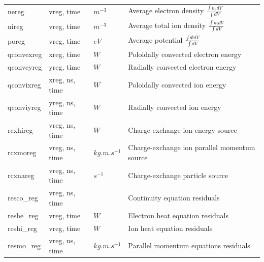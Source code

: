 \documentclass[a4paper,10pt]{report}
\begin{document}
\begin{center}
\begin{longtable}{|l|l|l|l|}
nereg \index{nereg}\index{b2tallies.nc, nereg}                                   & vreg, time     & $m^{-3}$      & Average electron density $\frac{\int n_e dV}{\int dV}$ \\
nireg \index{nireg}\index{b2tallies.nc, nireg}                                   & vreg, time     & $m^{-3}$      & Average total ion density $\frac{\int n_i dV}{\int dV}$  \\
poreg \index{poreg}\index{b2tallies.nc, poreg}                                   & vreg, time     & $eV$          & Average potential $\frac{\int \Phi dV}{\int dV}$ \\
qconvexreg \index{qconvexreg}\index{b2tallies.nc, qconvexreg}                    & xreg, time     & $W$           & Poloidally convected electron energy  \\
qconveyreg \index{qconveyreg}\index{b2tallies.nc, qconveyreg}                    & yreg, time     & $W$           & Radially convected electron energy \\
qconvixreg \index{qconvixreg}\index{b2tallies.nc, qconvixreg}                    & xreg, ns, time & $W$           & Poloidally convected ion energy \\
qconviyreg \index{qconviyreg}\index{b2tallies.nc, qconviyreg}                    & yreg, ns, time & $W$           & Radially convected ion energy \\
rcxhireg \index{rcxhireg}\index{b2tallies.nc, rcxhireg}                          & vreg, ns, time & $W$           & Charge-exchange ion energy source \\
rcxmoreg \index{rcxmoreg}\index{b2tallies.nc, rcxmoreg}                          & vreg, ns, time & $kg.m.s^{-1}$ & Charge-exchange ion parallel momentum source \\
rcxnareg \index{rcxnareg}\index{b2tallies.nc, rcxnareg}                          & vreg, ns, time & $s^{-1}$      & Charge-exchange particle source \\
resco\_reg \index{resco\_reg}\index{b2tallies.nc, resco\_reg}                    & vreg, ns, time &               & Continuity equation residuals \\
reshe\_reg \index{reshe\_reg}\index{b2tallies.nc, reshe\_reg}                    & vreg, time     & $W$           & Electron heat equation residuals \\
reshi\_reg \index{reshi\_reg}\index{b2tallies.nc, reshi\_reg}                    & vreg, time     & $W$           & Ion heat equation residuals \\
resmo\_reg \index{resmo\_reg}\index{b2tallies.nc, resmo\_reg}                    & vreg, ns, time & $kg.m.s^{-1}$ & Parallel momentum equations residuals \\

\end{longtable}
\end{center}
\end{document}
